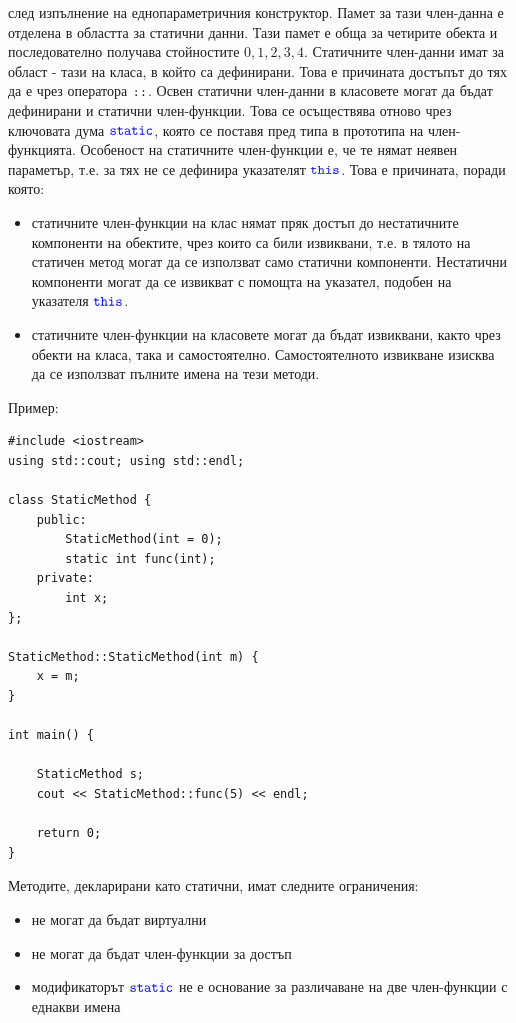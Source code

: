 \documentclass{article}
\begin{document}
след изпълнение на еднопараметричния конструктор. Памет за тази член-данна е отделена в областта за статични данни. Тази памет е обща за
четирите обекта и последователно получава стойностите $0, 1, 2, 3, 4$. Статичните член-данни имат за област - тази на класа, в който са
дефинирани. Това е причината достъпът до тях да е чрез оператора $\textcolor{black}{\texttt{::}}$.
Освен статични член-данни в класовете могат да бъдат дефинирани и статични член-функции. Това се осъществява отново чрез ключовата
дума $\textcolor{blue}{\texttt{static}}$, която се поставя пред типа в прототипа на член-функцията. Особеност на статичните член-функции е, че те нямат неявен
параметър, т.е. за тях не се дефинира указателят $\textcolor{blue}{\texttt{this}}$. Това е причината, поради която:
\begin{itemize}
    \item статичните член-функции на клас нямат пряк достъп до нестатичните компоненти на обектите, чрез които са били извиквани,
    т.е. в тялото на статичен метод могат да се използват само статични компоненти. Нестатични компоненти могат да се извикват с
    помощта на указател, подобен на указателя $\textcolor{blue}{\texttt{this}}$.
    \item статичните член-функции на класовете могат да бъдат извиквани, както чрез обекти на класа, така и самостоятелно.
    Самостоятелното извикване изисква да се използват пълните имена на тези методи.
\end{itemize}
Пример: \begin{lstlisting}[style=cpp]
#include <iostream>
using std::cout; using std::endl;

class StaticMethod {
    public:
        StaticMethod(int = 0);
        static int func(int);
    private:
        int x;
};

StaticMethod::StaticMethod(int m) {
    x = m;
}

int main() {

    StaticMethod s;
    cout << StaticMethod::func(5) << endl;

    return 0;
}
\end{lstlisting}
Методите, декларирани като статични, имат следните ограничения:
\begin{itemize}
    \item не могат да бъдат виртуални
    \item не могат да бъдат член-функции за достъп
    \item модификаторът $\textcolor{blue}{\texttt{static}}$ не е основание за различаване на две член-функции с еднакви имена
\end{itemize}
\end{document}
